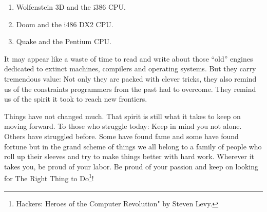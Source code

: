 \documentclass[book.tex]{subfiles}
\begin{document}
\begin{enumerate}
\item Wolfenstein 3D and the i386 CPU.
\item Doom and the i486 DX2 CPU.
\item Quake and the Pentium CPU.
\end{enumerate}

\bigskip

It may appear like a waste of time to read and write about those ``old'' engines dedicated to extinct machines, compilers and operating systems. But they carry tremendous value: Not only they are packed with clever tricks, they also remind us of the constraints programmers from the past had to overcome. They remind us of the spirit it took to reach new frontiers.\\
\par
Things have not changed much. That spirit is still what it takes to keep on moving forward. To those who struggle today: Keep in mind you not alone. Others have struggled before. Some have found fame and some have found fortune but in the grand scheme of things we all belong to a family of people who roll up their sleeves and try to make things better with hard work. Wherever it takes you, be proud of your labor. Be proud of your passion and keep on looking for The Right Thing to Do\footnote{Hackers: Heroes of the Computer Revolution" by Steven Levy.}!\\



\end{document}

